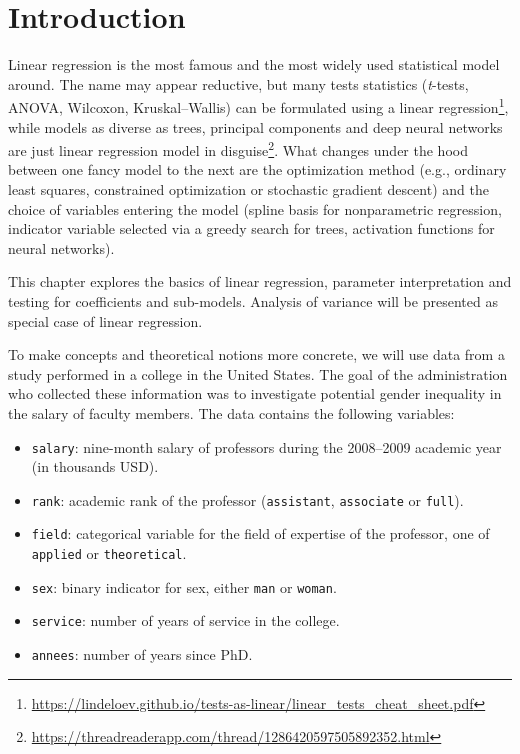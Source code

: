 \documentclass[
  11pt,
  letterpaper,
]{book}
\providecommand{\tightlist}{%
  \setlength{\itemsep}{0pt}\setlength{\parskip}{0pt}}
\renewcommand{\href}[2]{#2\footnote{\url{#1}}}
\theoremstyle{definition}
\theoremstyle{definition}
\theoremstyle{definition}
\theoremstyle{remark}
\begin{document}
\hypertarget{introduction}{%
\section{Introduction}\label{introduction}}

Linear regression is the most famous and the most widely used statistical model around. The name may appear reductive, but many tests statistics (\emph{t}-tests, ANOVA, Wilcoxon, Kruskal--Wallis) \href{https://lindeloev.github.io/tests-as-linear/linear_tests_cheat_sheet.pdf}{can be formulated using a linear regression}, while \href{https://threadreaderapp.com/thread/1286420597505892352.html}{models as diverse as trees, principal components and deep neural networks are just linear regression model in disguise}. What changes under the hood between one fancy model to the next are the optimization method (e.g., ordinary least squares, constrained optimization or stochastic gradient descent) and the choice of variables entering the model (spline basis for nonparametric regression, indicator variable selected via a greedy search for trees, activation functions for neural networks).

This chapter explores the basics of linear regression, parameter interpretation and testing for coefficients and sub-models. Analysis of variance will be presented as special case of linear regression.

To make concepts and theoretical notions more concrete, we will use data from a study performed in a college in the United States. The goal of the administration who collected these information was to investigate potential gender inequality in the salary of faculty members. The data contains the following variables:

\begin{itemize}
\tightlist
\item
  \texttt{salary}: nine-month salary of professors during the 2008--2009 academic year (in thousands USD).
\item
  \texttt{rank}: academic rank of the professor (\texttt{assistant}, \texttt{associate} or \texttt{full}).
\item
  \texttt{field}: categorical variable for the field of expertise of the professor, one of \texttt{applied} or \texttt{theoretical}.
\item
  \texttt{sex}: binary indicator for sex, either \texttt{man} or \texttt{woman}.
\item
  \texttt{service}: number of years of service in the college.
\item
  \texttt{annees}: number of years since PhD.
\end{itemize}
\end{document}
